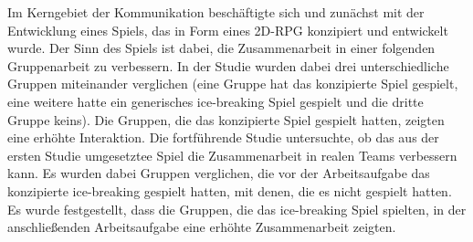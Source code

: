 Im Kerngebiet der Kommunikation beschäftigte sich \cite{nasir_cooperative_2013} und \cite{nasir_effect_2015} zunächst mit der Entwicklung eines  Spiels, das in Form eines 2D-\ac{RPG} konzipiert und entwickelt wurde. Der Sinn des Spiels ist dabei, die Zusammenarbeit in einer folgenden Gruppenarbeit zu verbessern. In der Studie wurden dabei drei unterschiedliche Gruppen miteinander verglichen (eine Gruppe hat das konzipierte Spiel gespielt, eine weitere hatte ein generisches ice-breaking Spiel gespielt und die dritte Gruppe keins). Die Gruppen, die das konzipierte Spiel gespielt hatten, zeigten eine erhöhte Interaktion. Die fortführende Studie untersuchte, ob das aus der ersten Studie umgesetztee Spiel die Zusammenarbeit in realen Teams verbessern kann. Es wurden dabei Gruppen verglichen, die vor der Arbeitsaufgabe das konzipierte ice-breaking gespielt hatten, mit denen, die es nicht gespielt hatten. Es wurde festgestellt, dass die Gruppen, die das ice-breaking Spiel spielten, in der anschließenden Arbeitsaufgabe eine erhöhte Zusammenarbeit zeigten.








